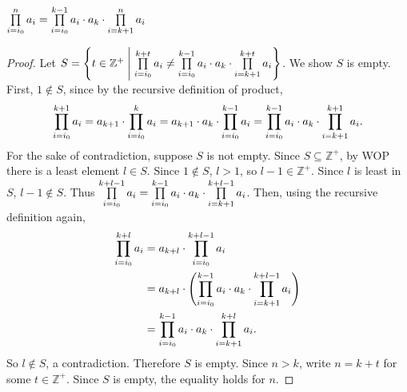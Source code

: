 \begin{lemma} $\prod\limits _{i=i_0}^{n}  a_i = \prod\limits _{i=i_0}^{k-1} a_i \cdot a_k \cdot\prod\limits _{i=k+1}^{n} a_i$\end{lemma}
\begin{proof}
Let $S=\left\{t\in\mathbb{Z}^+ \;\middle|\; \prod\limits_{i=i_0}^{k+t} a_i \neq \prod\limits_{i=i_0}^{k-1} a_i \cdot a_k \cdot \prod\limits_{i=k+1}^{k+t} a_i\right\}$. We show $S$ is empty. First, $1\notin S$, since by the recursive definition of product,
\[
\prod\limits_{i=i_0}^{k+1}a_i
=
a_{k+1}\cdot\prod\limits_{i=i_0}^{k}a_i
=
a_{k+1}\cdot a_k\cdot\prod\limits_{i=i_0}^{k-1}a_i
=
\prod\limits_{i=i_0}^{k-1}a_i\cdot a_k\cdot
\prod\limits_{i=k+1}^{k+1}a_i.
\]
For the sake of contradiction, suppose $S$ is not empty. Since $S\subseteq\mathbb{Z}^+$, by WOP there is a least element $l\in S$. Since $1\notin S$, $l>1$, so $l-1\in\mathbb{Z}^+$. Since $l$ is least in $S$, $l-1\notin S$. Thus $\prod\limits_{i=i_0}^{k+l-1} a_i = \prod\limits_{i=i_0}^{k-1} a_i \cdot a_k \cdot \prod\limits_{i=k+1}^{k+l-1} a_i$. Then, using the recursive definition again,
\begin{align*}
\prod\limits_{i=i_0}^{k+l} a_i
&=a_{k+l}\cdot\prod\limits_{i=i_0}^{k+l-1}a_i\\
&=a_{k+l}\cdot
\left(\prod\limits_{i=i_0}^{k-1} a_i \cdot a_k \cdot
\prod\limits_{i=k+1}^{k+l-1} a_i\right)\\
&=\prod\limits_{i=i_0}^{k-1} a_i \cdot a_k \cdot
\prod\limits_{i=k+1}^{k+l}a_i.
\end{align*}
So $l\notin S$, a contradiction. Therefore $S$ is empty. Since $n>k$, write $n=k+t$ for some $t\in\mathbb{Z}^+$. Since $S$ is empty, the equality holds for $n$.
\end{proof}
